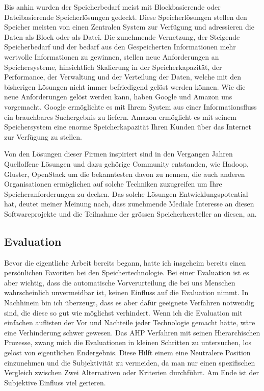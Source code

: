 Bis anhin wurden der Speicherbedarf meist mit Blockbasierende oder Dateibasierende Speicherlösungen gedeckt. Diese Speicherlösungen stellen den Speicher meisten von einen Zentralen System zur Verfügung und adressieren die Daten als Block oder als Datei.
Die zunehmende Vernetzung, der Steigende Speicherbedarf und der bedarf aus den Gespeicherten Informationen mehr wertvolle Informationen zu gewinnen, stellen neue  Anforderungen an Speichersysteme, hinsichtlich Skalierung in der Speicherkapazität, der Performance, der Verwaltung und der Verteilung der Daten, welche mit den bisherigen Lösungen nicht immer befriedigend gelöst werden können. Wie die neue Anforderungen gelöst werden kann, haben Google und Amazon uns vorgemacht. Google ermöglichte es mit Ihrem System aus einer Informationsfluss ein brauchbares Suchergebnis zu liefern. Amazon ermöglicht es mit seinem Speichersystem eine enorme Speicherkapazität Ihren Kunden über das Internet zur Verfügung zu stellen. 

Von den Lösungen dieser Firmen inspiriert sind in den Vergangen Jahren Quelloffene Lösungen und dazu gehörige Community entstanden, wie Hadoop, Gluster, OpenStack um die bekanntesten davon zu nennen, die auch anderen Organisationen ermöglichen auf solche Techniken zuzugreifen um Ihre Speicheranforderungen zu decken. Das solche Lösungen Entwicklungspotential hat, deutet meiner Meinung nach, dass zunehmende Mediale Interesse an diesen Softwareprojekte und die Teilnahme der grössen Speicherhersteller an diesen, an. 

\subsection*{Evaluation}
Bevor die eigentliche Arbeit bereits begann, hatte ich insgeheim bereits einen persönlichen Favoriten bei den Speichertechnologie. Bei einer Evaluation ist es aber wichtig, dass die automatische Vorverurteilung die bei uns Menschen wahrscheinlich unvermeidbar ist, keinen Einfluss auf die Evaluation nimmt. In Nachhinein bin ich überzeugt, dass es aber dafür geeignete Verfahren notwendig sind, die diese so gut wie möglichst verhindert. Wenn ich die Evaluation mit einfachen auflisten der Vor und Nachteile jeder Technologie gemacht hätte, wäre eine Verhinderung schwer gewesen. Das AHP Verfahren mit seinen Hierarchischen Prozesse, zwang mich die Evaluationen in kleinen Schritten zu untersuchen, los gelöst von eigentlichen Endergebnis. Diese Hilft einem eine Neutralere Position einzunehmen und die Subjektivität zu vermeiden, da man nur einen spezifischen Vergleich zwischen Zwei Alternativen oder Kriterien durchführt. Am Ende ist der Subjektive Einfluss viel gerieren.

